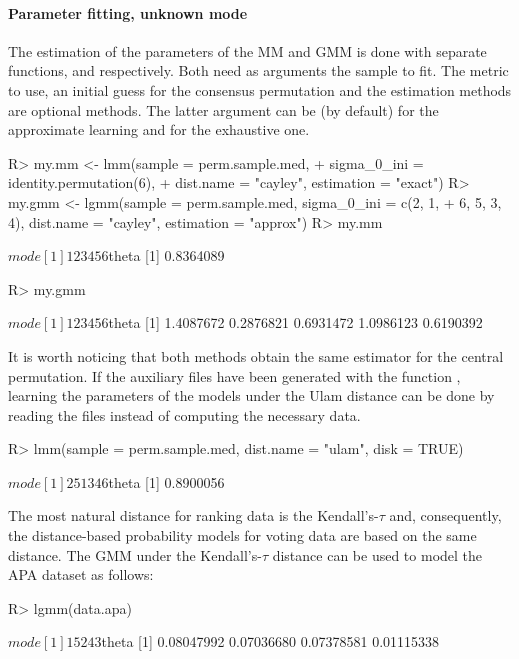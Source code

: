 \documentclass[article,nojss]{jss}
\begin{document}
\paragraph*{Parameter fitting, unknown mode}
The estimation of the parameters of the MM and GMM is done with separate functions,  and  respectively. Both need as arguments the sample to fit. The metric to use, an initial guess for the consensus permutation and the estimation methods are optional methods. The latter argument can be  (by default) for the approximate learning and  for the exhaustive one. 
\begin{Schunk}
\begin{Sinput}
R> my.mm <- lmm(sample = perm.sample.med, 
+     sigma_0_ini = identity.permutation(6), 
+     dist.name = "cayley", estimation = "exact")
R> my.gmm <- lgmm(sample = perm.sample.med, sigma_0_ini = c(2, 1, 
+     6, 5, 3, 4), dist.name = "cayley", estimation = "approx")
R> my.mm
\end{Sinput}
\begin{Soutput}
$mode
[1] 1 2 3 4 5 6

$theta
[1] 0.8364089
\end{Soutput}
\begin{Sinput}
R> my.gmm
\end{Sinput}
\begin{Soutput}
$mode
[1] 1 2 3 4 5 6

$theta
[1] 1.4087672 0.2876821 0.6931472 1.0986123 0.6190392
\end{Soutput}
\end{Schunk}

It is worth noticing that both methods obtain the same estimator for the central permutation. If the auxiliary files have been generated with the function , learning the parameters of the models under the Ulam distance can be done by reading the files instead of computing the necessary data. 
\begin{Schunk}
\begin{Sinput}
R> lmm(sample = perm.sample.med, dist.name = "ulam", disk = TRUE)
\end{Sinput}
\begin{Soutput}
$mode
[1] 2 5 1 3 4 6

$theta
[1] 0.8900056
\end{Soutput}
\end{Schunk}

The most natural distance for ranking data is the Kendall's-$\tau$ and, consequently, the distance-based probability models for voting data are based on the same distance. The GMM under the Kendall's-$\tau$ distance can be used to model the APA dataset as follows:
\begin{Schunk}
\begin{Sinput}
R> lgmm(data.apa)
\end{Sinput}
\begin{Soutput}
$mode
[1] 1 5 2 4 3

$theta
[1] 0.08047992 0.07036680 0.07378581 0.01115338
\end{Soutput}
\end{Schunk}
\end{document}
